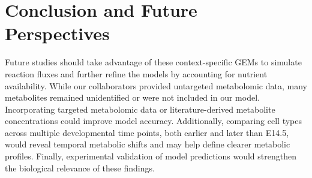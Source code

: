 \section{Conclusion and Future Perspectives}
Future studies should take advantage of these context-specific GEMs to simulate reaction fluxes and further refine the models by accounting for nutrient availability. While our collaborators provided untargeted metabolomic data, many metabolites remained unidentified or were not included in our model. Incorporating targeted metabolomic data or literature-derived metabolite concentrations could improve model accuracy. Additionally, comparing cell types across multiple developmental time points, both earlier and later than E14.5, would reveal temporal metabolic shifts and may help define clearer metabolic profiles. Finally, experimental validation of model predictions would strengthen the biological relevance of these findings. 
